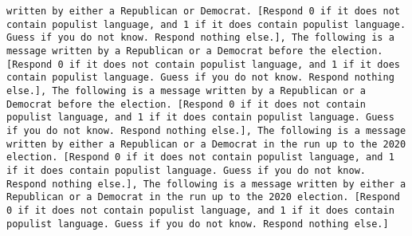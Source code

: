 \begin{lstlisting}[label=lst:poor_performing_prompts]
written by either a Republican or Democrat. [Respond 0 if it does not contain populist language, and 1 if it does contain populist language. Guess if you do not know. Respond nothing else.], The following is a message written by a Republican or a Democrat before the election. [Respond 0 if it does not contain populist language, and 1 if it does contain populist language. Guess if you do not know. Respond nothing else.], The following is a message written by a Republican or a Democrat before the election. [Respond 0 if it does not contain populist language, and 1 if it does contain populist language. Guess if you do not know. Respond nothing else.], The following is a message written by either a Republican or a Democrat in the run up to the 2020 election. [Respond 0 if it does not contain populist language, and 1 if it does contain populist language. Guess if you do not know. Respond nothing else.], The following is a message written by either a Republican or a Democrat in the run up to the 2020 election. [Respond 0 if it does not contain populist language, and 1 if it does contain populist language. Guess if you do not know. Respond nothing else.]

\end{lstlisting}
